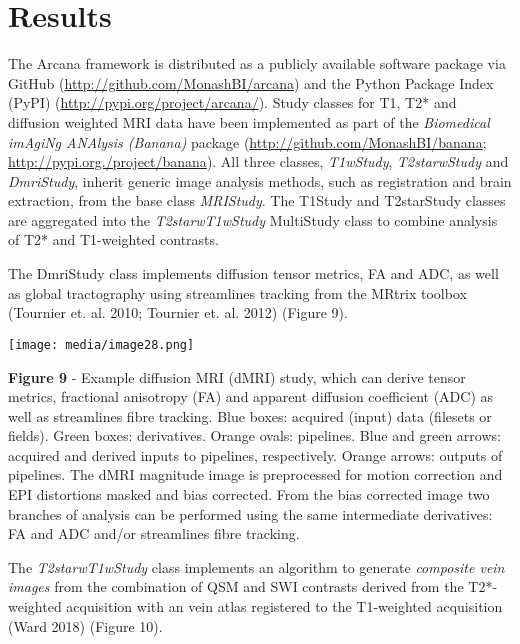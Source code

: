 \hypertarget{results}{%
\section{Results}\label{results}}

The Arcana framework is distributed as a publicly available software
package via GitHub
(\href{http://github.com/MonashBI/arcana}{{http://github.com/MonashBI/arcana}})
and the Python Package Index (PyPI)
(\href{https://pypi.org/project/arcana/}{{http://pypi.org/project/arcana/}}).
Study classes for T1, T2* and diffusion weighted MRI data have been
implemented as part of the \emph{Biomedical imAgiNg ANAlysis (Banana)}
package
(\href{https://github.com/MonashBI/banana}{{http://github.com/MonashBI/banana}};
\href{http://pypi.org./project/banana}{{http://pypi.org./project/banana}}).
All three classes, \emph{T1wStudy}, \emph{T2starwStudy} and
\emph{DmriStudy}, inherit generic image analysis methods, such as
registration and brain extraction, from the base class \emph{MRIStudy}.
The T1Study and T2starStudy classes are aggregated into the
\emph{T2starwT1wStudy} MultiStudy class to combine analysis of T2* and
T1-weighted contrasts.

The DmriStudy class implements diffusion tensor metrics, FA and ADC, as
well as global tractography using streamlines tracking from the MRtrix
toolbox (Tournier et. al. 2010; Tournier et. al. 2012) (Figure 9).

\texttt{[image: media/image28.png]}

\textbf{Figure 9} - Example diffusion MRI (dMRI) study, which can derive
tensor metrics, fractional anisotropy (FA) and apparent diffusion
coefficient (ADC) as well as streamlines fibre tracking. Blue boxes:
acquired (input) data (filesets or fields). Green boxes: derivatives.
Orange ovals: pipelines. Blue and green arrows: acquired and derived
inputs to pipelines, respectively. Orange arrows: outputs of pipelines.
The dMRI magnitude image is preprocessed for motion correction and EPI
distortions masked and bias corrected. From the bias corrected image two
branches of analysis can be performed using the same intermediate
derivatives: FA and ADC and/or streamlines fibre tracking.

The \emph{T2starwT1wStudy} class implements an algorithm to generate
\emph{composite vein images} from the combination of QSM and SWI
contrasts derived from the T2*-weighted acquisition with an vein atlas
registered to the T1-weighted acquisition (Ward 2018) (Figure 10).

